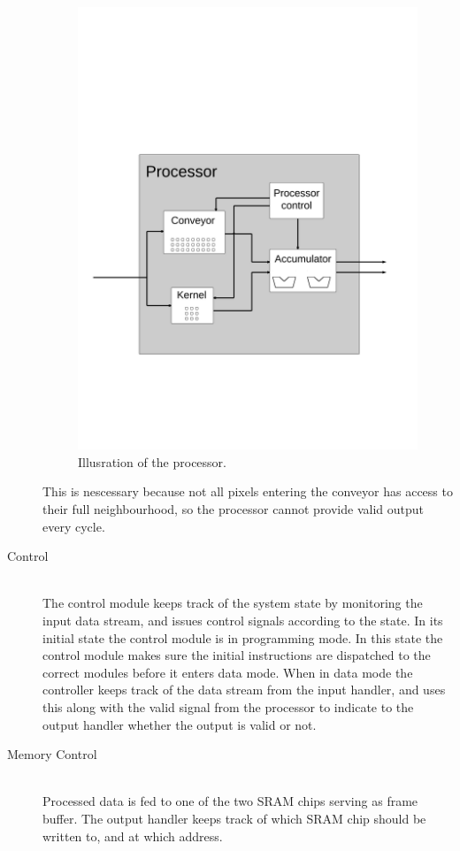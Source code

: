 \begin{Description}
\begin{description}
\begin{figure}[h!]
    \includegraphics[width=\linewidth]{img/processor.png}
    \caption{Illusration of the processor.}
    \label{fig:Convolution}
\end{figure}

        This is nescessary because not all pixels entering the conveyor has access to their full neighbourhood, so the processor cannot provide valid output every cycle.
    \item[Control] \hfill\\
        The control module keeps track of the system state by monitoring the input data stream, and issues control signals according to the state.
        In its initial state the control module is in programming mode. 
        In this state the control module makes sure the initial instructions are dispatched to the correct modules before it enters data mode.
        When in data mode the controller keeps track of the data stream from the input handler, and uses this along with the valid signal from the processor to indicate to the output handler whether the output is valid or not.
    \item[Memory Control] \hfill\\
        Processed data is fed to one of the two SRAM chips serving as frame buffer. The output handler keeps track of which SRAM chip should be written to, and at which address.
\end{description}


\end{Description}
